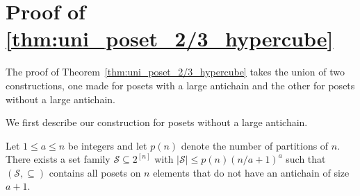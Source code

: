 \documentclass[11pt]{article}
\newcommand{\1}{\mathbbm{1}}
\begin{document}
\section{Proof of \cref{thm:uni_poset_2/3_hypercube}}
The proof of Theorem~\ref{thm:uni_poset_2/3_hypercube} takes the union of two constructions, one made for posets with a large antichain and the other for posets without a large antichain.  

We first describe our construction for posets without a large antichain.
\begin{lemma}
\label{lem:hypercube_chain}
    Let $1\leq a\leq n$ be integers and let $p(n)$ denote the number of partitions of $n$.
    There exists a set family $\mathcal{S}\subseteq 2^{[n]}$ with $|\mathcal{S}|\leq p(n)(n/a+1)^a$ such that $(\mathcal{S},\subseteq)$ contains all posets on $n$ elements that do not have an antichain of size $a+1$. 
\end{lemma}
\end{document}
